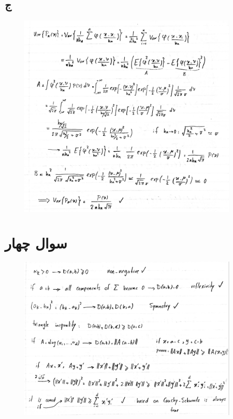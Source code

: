 \documentclass[12pt,onecolumn,a4paper]{article}
\begin{document}
\subsection*{ج}
\begin{figure}[h!]
    \begin{center}
    \includegraphics[width=\linewidth]{hand_written/33.jpg}
    \end{center}
\end{figure}
\newpage
\section{سوال چهار}
\begin{figure}[h!]
    \begin{center}
    \includegraphics[width=\linewidth]{hand_written/4.jpg}
    \end{center}
\end{figure}
\end{document}
